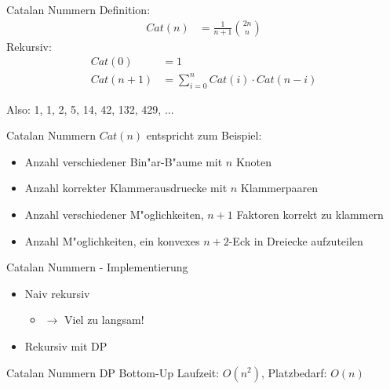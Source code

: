 \documentclass[18pt]{beamer}
\begin{document}
\begin{frame}{Catalan Nummern}
Definition:
\begin{align*}
Cat \left( n \right) &= \frac{1}{n+1} \binom{2n}{n} 
\end{align*}
Rekursiv:
\begin{align*}
Cat \left( 0 \right) &= 1 \\
Cat \left( n + 1 \right) &= \sum_{i=0}^n Cat \left( i \right) \cdot Cat \left( n - i \right)
\end{align*}

Also: 1, 1, 2, 5, 14, 42, 132, 429, ...
\end{frame}

\begin{frame}{Catalan Nummern}
$Cat \left( n \right)$ entspricht zum Beispiel:
\begin{itemize}
\item Anzahl verschiedener Bin"ar-B"aume mit $n$ Knoten
\item Anzahl korrekter Klammerausdruecke mit $n$ Klammerpaaren
\item Anzahl verschiedener M"oglichkeiten, $n+1$ Faktoren korrekt zu klammern
\item Anzahl M"oglichkeiten, ein konvexes $n+2$-Eck in Dreiecke aufzuteilen
\end{itemize}
\end{frame}

\begin{frame}{Catalan Nummern - Implementierung}
\begin{itemize}
\item Naiv rekursiv
\begin{itemize}
\item $\rightarrow$ Viel zu langsam! 
\end{itemize}
\item Rekursiv mit DP
\end{itemize}
\end{frame}

\begin{frame} {Catalan Nummern DP Bottom-Up}
Laufzeit: $O \left( n^2 \right)$, Platzbedarf: $O \left( n \right)$
\end{frame}
\end{document}
